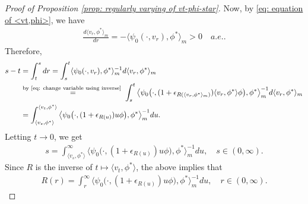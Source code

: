\begin{proof}[Proof of Proposition \ref{prop: regularly varying of vt-phi-star}]
	Now, by \eqref{eq: equation of <vt,phi>}, we have
\begin{align}
	\frac{d \langle v_r, \phi^* \rangle_m}{dr}
	= - \langle \psi_0(\cdot ,v_r) ,\phi^*\rangle_m
	> 0
	\quad a.e..
\end{align}
	Therefore,
\begin{align}
	s-t
	& = \int_t^s dr
	= \int_s^t \langle \psi_0(\cdot ,v_r), \phi^*\rangle _m^{-1} d\langle v_r ,\phi^* \rangle_m
	\\&\overset{\text{by \eqref{eq: change variable using inverse} }}{=} \int_s^t \big\langle \psi_0\big( \cdot ,(1+ \epsilon_{R(\langle v_r,\phi^* \rangle_m)})\langle v_r,\phi^*\rangle \phi \big), \phi^* \big\rangle _m^{-1} d\langle v_r ,\phi^* \rangle_m
	\\&= \int_{\langle v_s,\phi^*\rangle}^{\langle v_t, \phi^* \rangle} \big\langle \psi_0 \big( \cdot ,( 1 + \epsilon_{R(u)} ) u \phi \big), \phi^* \big\rangle_m^{-1} du.
\end{align}
	Letting $t\to 0$, we get
\begin{align}
	s
	= \int_{\langle v_s,\phi^*\rangle}^\infty \big\langle \psi_0 \big(\cdot ,( 1 + \epsilon_{R(u)} ) u \phi \big), \phi^* \big\rangle_m^{-1} du,
	\quad s\in (0,\infty).
\end{align}
	Since $R$ is the inverse of $t\mapsto \langle v_t,\phi^*\rangle$, the above implies that
\begin{align}\label{eq: integral equation for R}
	R(r)
	= \int_r^\infty \big\langle \psi_0 \big(\cdot ,( 1 + \epsilon_{R(u)} ) u \phi \big), \phi^* \big\rangle_m^{-1} du,
	\quad r\in (0,\infty).
\end{align}
	

\end{proof}
